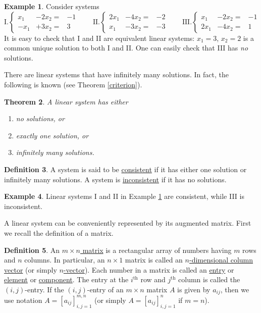 \documentclass[12pt,letterpaper]{book}
\numberwithin{equation}{section}
\newtheorem{thm}{\textbf{Theorem}}[section]
\theoremstyle{definition}
\newtheorem{defi}[thm]{\textbf{Definition}}
\newtheorem{example}[thm]{\textbf{Example}}
\begin{document}
\begin{example}\label{three examples} Consider systems
$$\text{I.}\left\{\begin{array}{rrr}
x_1&-2x_2=&-1
\\ -x_1 &+3x_2=&3 \end{array}\right.\qquad \text{II.}\left\{\begin{array}{rrr}
2x_1&-4x_2=&-2
\\ x_1 &-3x_2=&-3 \end{array}\right. \qquad \text{III.}\left\{\begin{array}{rrr}
x_1&-2x_2=&-1
\\ 2x_1 &-4x_2=&1 \end{array}\right.$$
It is easy to check that I and II are equivalent linear systems: $x_1=3$, $x_2=2$ is a common unique solution to both I and II. One can easily check that III has \textit{no} solutions.
\end{example}

There are linear systems that have infinitely many solutions. In fact, the following is known (see Theorem \ref{criterion}).

\begin{thm}\label{three possibility}
 A linear system has either
\begin{enumerate}
\item no solutions, or
\item exactly one solution, or
\item infinitely many solutions.
\end{enumerate}
\end{thm}

\begin{defi} A system is said to be \underline{consistent} if
it has either one solution or infinitely many solutions. A system is \underline{inconsistent} if it has no solutions.
\end{defi}

\begin{example}
Linear systems I and II in Example \ref{three examples} are consistent, while III is inconsistent.
\end{example}

A linear system can be conveniently represented by its augmented matrix. First we recall the definition of a matrix.

\begin{defi} An \underline{$m\times n$ matrix} is a
rectangular array of numbers having $m$ rows and $n$ columns. In particular, an $n\times 1$ matrix is called an \underline{$n$-dimensional column vector} (or simply \underline{$n$-vector}). Each
number in a matrix is called an \underline{entry} or \underline{element} or \underline{component}. The entry at the $i^{\text{th}}$ row and $j^{\text{th}}$ column is called the $(i,j)$-entry. If the $(i,j)$-entry of an $m\times n$ matrix $A$ is given by $a_{ij}$, then we use notation $A=[a_{ij}]_{i,j=1}^{m,n}$ (or simply $A=[a_{ij}]_{i,j=1}^n$ if $m=n$).
\end{defi}
\end{document}
